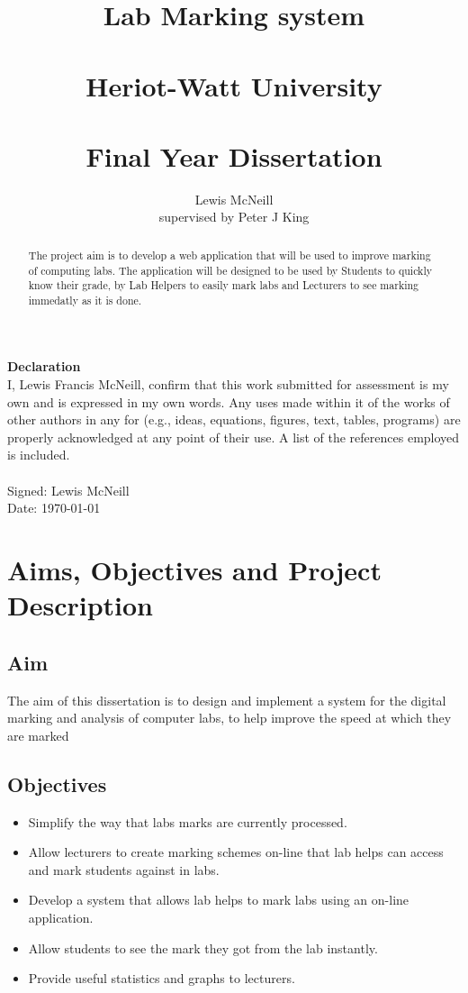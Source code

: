 \documentclass[12pt]{article}  %
\title{Lab Marking system \\~\\  \large{Heriot-Watt University} \\~\\ Final Year Dissertation}
\author{Lewis McNeill\\
supervised by
Peter J King}
\theoremstyle{definition}
\theoremstyle{remark}
\begin{document}
\maketitle
{}
\newpage 

\doublespacing
\textbf{\Large{Declaration}} \\[2em]
I, Lewis Francis McNeill, confirm that this work submitted for assessment is my own and is expressed in my own words. Any uses made within it of the works of other authors in any for (e.g., ideas, equations, figures, text, tables, programs) are properly acknowledged at any point of their use. A list of the references employed is included.
\\
\\
Signed: Lewis McNeill
\\
Date: \today

\newpage                    
\begin{abstract}

The project aim is to develop a web application that will be used to improve marking of computing labs. The application will be designed to be used by Students to quickly know their grade, by Lab Helpers to easily mark labs and Lecturers to see marking immedatly as it is done.



\end{abstract}

\newpage                     

\singlespacing
\tableofcontents
\doublespacing



\newpage        

\section{Aims, Objectives and Project Description}
\setcounter{page}{1}

\subsection{Aim}
The aim of this dissertation is to design and implement a system for the digital marking and analysis of computer labs, to help improve the speed at which they are marked

\subsection{Objectives}
\begin{itemize}
\item Simplify the way that labs marks are currently processed.
\item Allow lecturers to create marking schemes on-line that lab helps can access and mark students against in labs.
\item Develop a system that allows lab helps to mark labs using an on-line application.
\item Allow students to see the mark they got from the lab instantly.
\item Provide useful statistics and graphs to lecturers.
\end{itemize}
\end{document}
